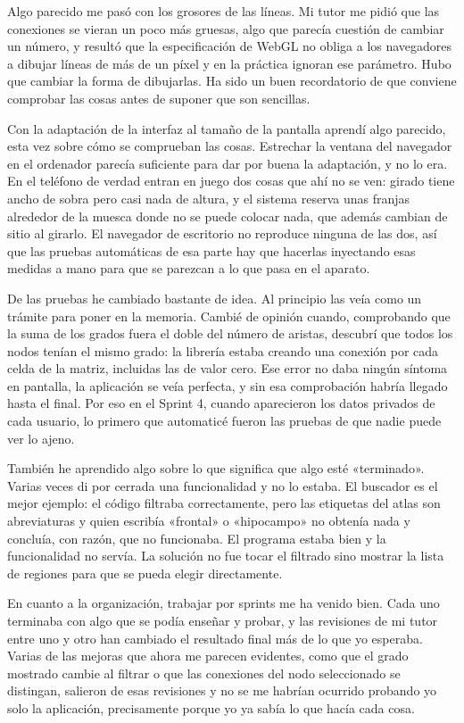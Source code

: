 Algo parecido me pasó con los grosores de las líneas. Mi tutor me pidió que las conexiones se vieran
un poco más gruesas, algo que parecía cuestión de cambiar un número, y resultó que la especificación
de WebGL no obliga a los navegadores a dibujar líneas de más de un píxel y en la práctica ignoran ese
parámetro. Hubo que cambiar la forma de dibujarlas. Ha sido un buen recordatorio de que conviene
comprobar las cosas antes de suponer que son sencillas.

Con la adaptación de la interfaz al tamaño de la pantalla aprendí algo parecido, esta vez sobre cómo
se comprueban las cosas. Estrechar la ventana del navegador en el ordenador parecía suficiente para
dar por buena la adaptación, y no lo era. En el teléfono de verdad entran en juego dos cosas que ahí
no se ven: girado tiene ancho de sobra pero casi nada de altura, y el sistema reserva unas franjas
alrededor de la muesca donde no se puede colocar nada, que además cambian de sitio al girarlo. El
navegador de escritorio no reproduce ninguna de las dos, así que las pruebas automáticas de esa parte
hay que hacerlas inyectando esas medidas a mano para que se parezcan a lo que pasa en el aparato.

De las pruebas he cambiado bastante de idea. Al principio las veía como un trámite para poner en la
memoria. Cambié de opinión cuando, comprobando que la suma de los grados fuera el doble del número de
aristas, descubrí que todos los nodos tenían el mismo grado: la librería estaba creando una conexión
por cada celda de la matriz, incluidas las de valor cero. Ese error no daba ningún síntoma en
pantalla, la aplicación se veía perfecta, y sin esa comprobación habría llegado hasta el final. Por
eso en el Sprint 4, cuando aparecieron los datos privados de cada usuario, lo primero que automaticé
fueron las pruebas de que nadie puede ver lo ajeno.

También he aprendido algo sobre lo que significa que algo esté «terminado». Varias veces di por
cerrada una funcionalidad y no lo estaba. El buscador es el mejor ejemplo: el código filtraba
correctamente, pero las etiquetas del atlas son abreviaturas y quien escribía «frontal» o
«hipocampo» no obtenía nada y concluía, con razón, que no funcionaba. El programa estaba bien y la
funcionalidad no servía. La solución no fue tocar el filtrado sino mostrar la lista de regiones para
que se pueda elegir directamente.

En cuanto a la organización, trabajar por sprints me ha venido bien. Cada uno terminaba con algo que
se podía enseñar y probar, y las revisiones de mi tutor entre uno y otro han cambiado el resultado
final más de lo que yo esperaba. Varias de las mejoras que ahora me parecen evidentes, como que el
grado mostrado cambie al filtrar o que las conexiones del nodo seleccionado se distingan, salieron de
esas revisiones y no se me habrían ocurrido probando yo solo la aplicación, precisamente porque yo ya
sabía lo que hacía cada cosa.

